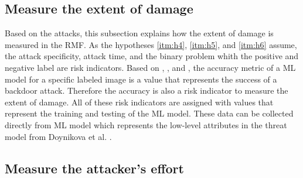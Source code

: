 \subsection{Measure the extent of damage}
\label{sec:ext_dmg}

Based on the attacks, this subsection explains how the extent of damage is measured in the RMF. As the hypotheses \ref{itm:h4}, \ref{itm:h5}, and \ref{itm:h6} assume, the attack specificity, attack time, and the binary problem whith the positive and negative label are risk indicators. Based on \cite{DBLP:journals/corr/abs-1708-06733}, \cite{turner2018clean}, and \cite{DBLP:journals/corr/abs-1910-00033}, the accuracy metric of a ML model for a specific labeled image is a value that represents the success of a backdoor attack. Therefore the accuracy is also a risk indicator to measure the extent of damage. All of these risk indicators are assigned with values that represent the training and testing of the ML model. These data can be collected directly from ML model which represents the low-level attributes in the threat model from Doynikova et al. \cite{DBLP:conf/crisis/DoynikovaNGK20}.

\subsection{Measure the attacker's effort}
\label{sec:find_effort}

